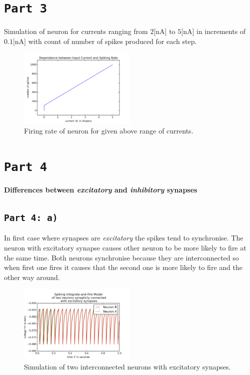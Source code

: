 \documentclass[12pt,a4paper,twocolumn]{article}
\begin{document}
\section*{\texttt{Part 3}}
Simulation of neuron for currents ranging from $2 \text{[nA]}$ to $5 \text{[nA]}$ in increments of $0.1 \text{[nA]}$ with count of number of spikes produced for each step.\\
\begin{figure}[htbp]
\centering
\includegraphics[width=0.5\textwidth]{figures/figure3.png}
\caption{Firing rate of neuron for given above range of currents.\label{fig:part3}}
\vspace{0.4cm}
\end{figure}

\section*{\texttt{Part 4}}
\textbf{\large Differences between \emph{excitatory} and \emph{inhibitory} synapses}

\subsection*{\texttt{Part 4: a)}}
In first case where synapses are \emph{excitatory} the spikes tend to synchronise. The neuron with excitatory synapse causes other neuron to be more likely to fire at the same time. Both neurons synchronise because they are interconnected so when first one fires it causes that the second one is more likely to fire and the other way around.\\

\begin{figure}[htbp]
\centering
\includegraphics[width=0.5\textwidth]{figures/figure4a.png}
\caption{Simulation of two interconnected neurons with excitatory synapses.\label{fig:part4a}}
\vspace{0.4cm}
\end{figure}
\end{document}
